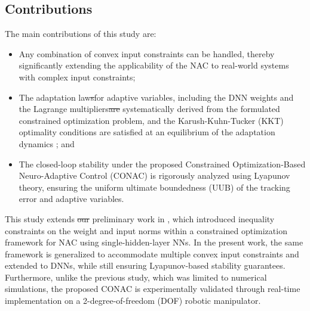 \documentclass[letterpaper, journal]{IEEEtran}
\providecommand{\DIFadd}[1]{{\protect\color{blue}\uwave{#1}}} %
\providecommand{\DIFdel}[1]{{\protect\color{red}\sout{#1}}} %
\providecommand{\DIFaddbegin}{} %
\providecommand{\DIFaddend}{} %
\providecommand{\DIFdelbegin}{} %
\providecommand{\DIFdelend}{} %
\begin{document}
\subsection{Contributions}

The main contributions of this study are:
\begin{itemize}

  \item
  Any combination of convex input constraints can be handled, thereby significantly extending the applicability of the NAC to real-world systems with complex input constraints;

  \item 
  The adaptation law\DIFdelbegin \DIFdel{s}\DIFdelend  for adaptive variables, including the DNN weights and the Lagrange multipliers\DIFdelbegin \DIFdel{are }\DIFdelend \DIFaddbegin \DIFadd{, is }\DIFaddend systematically derived from the formulated constrained optimization problem, and the Karush-Kuhn-Tucker (KKT) optimality conditions are satisfied at an equilibrium of the adaptation dynamics \cite[Chap. 12, Thm. 12.1]{Nocedal:2006aa}; and

  \item 
  The closed-loop stability under the proposed Constrained Optimization-Based Neuro-Adaptive Control (CONAC) is rigorously analyzed using Lyapunov theory, ensuring the uniform ultimate boundedness (UUB) of the tracking error and adaptive variables.

\end{itemize}

This study extends \DIFdelbegin \DIFdel{our }\DIFdelend \DIFaddbegin \DIFadd{the }\DIFaddend preliminary work in \cite{Ryu:2025ab,Ryu:2025aa}, which introduced inequality constraints on the weight and input norms within a constrained optimization framework for NAC using single-hidden-layer NNs. 
In the present work, the same framework is generalized to accommodate multiple convex input constraints and extended to DNNs, while still ensuring Lyapunov-based stability guarantees.
Furthermore, unlike the previous study, which was limited to numerical simulations, the proposed CONAC is experimentally validated through real-time implementation on a 2-degree-of-freedom (DOF) robotic manipulator.
\end{document}
